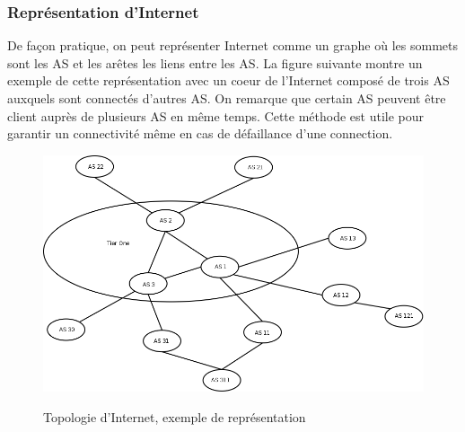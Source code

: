 \subsubsection{Repr\'esentation d'Internet}
\par
De fa\c con pratique, on peut repr\'esenter Internet comme un graphe o\`u les sommets sont les AS et les ar\^etes les liens entre les AS. La figure suivante montre un exemple de cette repr\'esentation avec un coeur de l'Internet compos\'e de trois AS auxquels sont connect\'es d'autres AS. On remarque que certain AS peuvent \^etre client aupr\`es de plusieurs AS en m\^eme temps. Cette m\'ethode est utile pour garantir un connectivit\'e m\^eme en cas de d\'efaillance d'une connection.

\begin{figure}[ht]
\centering
 \fbox
 {
 \includegraphics[width=16cm]{./schema/topologie_internet.png}
 }
  \caption{\label{topologie}Topologie d'Internet, exemple de repr\'esentation}
\end{figure}



%
